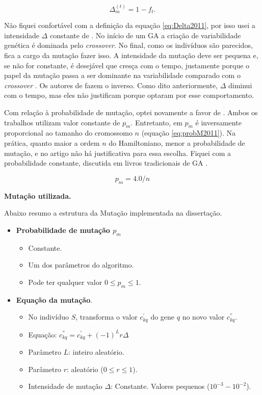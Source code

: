 \begin{equation}\label{eq:Delta2011}
	\Delta^{(t)}_m =  1 - f_t.
\end{equation}	

	Não fiquei confortável com a definição da equação \ref{eq:Delta2011}, por isso usei a intensidade $\Delta$ constante de \cite{metodo2004}. No início de um GA a criação de variabilidade genética é dominada pelo \emph{crossover}. No final, como os indivíduos são parecidos, fica a cargo da mutação fazer isso. A intensidade da mutação deve ser pequena e, se não for constante, é desejável que cresça com o tempo, justamente porque o papel da mutação passa a ser dominante na variabilidade comparado com o \emph{crossover} \cite{Linden2008}. Os autores de \cite{metodo2011} fazem o inverso. Como dito anteriormente, $\Delta$ diminui com o tempo, mas eles não justificam porque optaram por esse comportamento.
	
	Com relação à probabilidade de mutação, optei novamente a favor de \cite{metodo2004}. Ambos os trabalhos utilizam valor constante de $p_m$. Entretanto, em \cite{metodo2011} $p_m$ é inversamente proporcional ao tamanho do cromossomo $n$ (equação \ref{eq:probM2011}). Na prática, quanto maior a ordem $n$ do Hamiltoniano, menor a probabilidade de mutação, e no artigo não há justificativa para essa escolha. Fiquei com a probabilidade constante, discutida em livros tradicionais de GA \cite{Mitchell98, Linden2008}.

	\begin{equation}\label{eq:probM2011}
		p_m = 4.0/n
	\end{equation}


	\textbf{Mutação utilizada.}
	
	Abaixo resumo a estrutura da Mutação implementada na dissertação.
	
	
	\begin{itemize}
		\item \textbf{Probabilidade de mutação $p_m$}
			\begin{itemize}
				\item Constante.
				\item Um dos parâmetros do algoritmo.
				\item Pode ter qualquer valor $0 \leq p_m \leq 1$.
			\end{itemize}
		\item \textbf{Equação da mutação}.
			\begin{itemize}
				\item No indivíduo $S$, transforma o valor $c^{'}_{kq}$ do gene $q$ no novo valor $c^{''}_{kq}$.
				\item Equação: $c^{''}_{kq} = c^{'}_{kq} + (-1)^{L} r \Delta$
				\item Parâmetro $L$: inteiro aleatório.
				\item Parâmetro $r$: aleatório ($0 \leq r \leq 1$).
				\item Intensidade de mutação $\Delta$: Constante. Valores pequenos ($10^{-3}-10^{-2}$).
			\end{itemize}
	\end{itemize}
	

